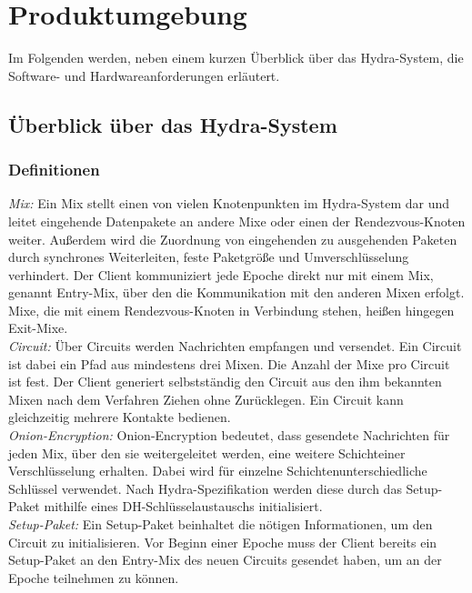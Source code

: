 \section{Produktumgebung}
Im Folgenden werden, neben einem kurzen Überblick über das Hydra-System, die Software- und Hardwareanforderungen erläutert.
\subsection{Überblick über das Hydra-System}

\subsubsection{Definitionen}
\textit{Mix:}
Ein Mix stellt einen von vielen Knotenpunkten im Hydra-System dar und leitet eingehende Datenpakete an andere Mixe oder einen der Rendezvous-Knoten weiter.
Außerdem wird die Zuordnung von eingehenden zu ausgehenden Paketen durch synchrones Weiterleiten, feste Paketgröße und Umverschlüsselung verhindert.
Der Client kommuniziert jede Epoche direkt nur mit einem Mix, genannt Entry-Mix, über den die Kommunikation mit den anderen Mixen erfolgt.
Mixe, die mit einem Rendezvous-Knoten in Verbindung stehen, heißen hingegen Exit-Mixe.\\

\textit{Circuit:}
Über Circuits werden Nachrichten empfangen und versendet.
Ein Circuit ist dabei ein Pfad aus mindestens drei Mixen.
Die Anzahl der Mixe pro Circuit ist fest. 
Der Client generiert selbstständig den Circuit aus den ihm bekannten Mixen nach dem Verfahren \glqq Ziehen ohne Zurücklegen\grqq.
Ein Circuit kann gleichzeitig mehrere Kontakte bedienen.\\

\textit{Onion-Encryption:}
Onion-Encryption bedeutet, dass gesendete Nachrichten für jeden Mix, über den sie weitergeleitet werden, eine weitere \glqq Schicht\grqq \space einer Verschlüsselung erhalten. Dabei wird für einzelne \glqq Schichten\grqq \space unterschiedliche Schlüssel verwendet. Nach Hydra-Spezifikation werden diese durch das Setup-Paket mithilfe eines DH-Schlüsselaustauschs initialisiert.\\

\textit{Setup-Paket:}
Ein Setup-Paket beinhaltet die nötigen Informationen, um den Circuit zu initialisieren.
Vor Beginn einer Epoche muss der Client bereits ein Setup-Paket an den Entry-Mix des
neuen Circuits gesendet haben, um an der Epoche teilnehmen zu können.\\

